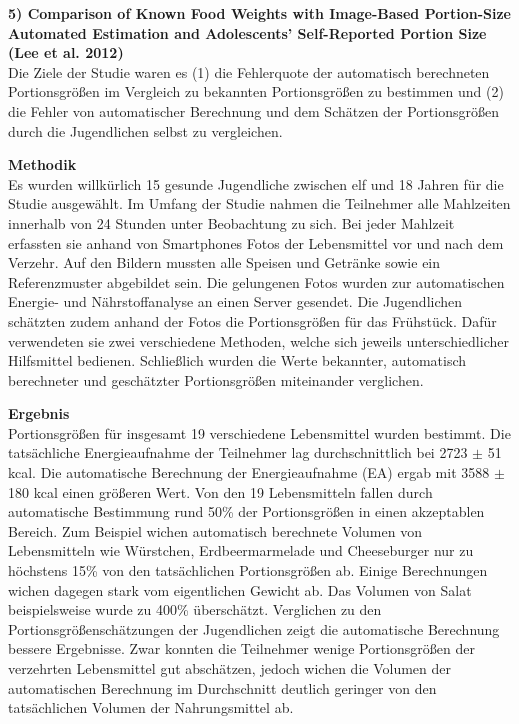 \textbf{5) Comparison of Known Food Weights with Image-Based Portion-Size Automated Estimation and Adolescents’ Self-Reported Portion Size (Lee et al. 2012)}\\
Die Ziele der Studie waren es (1) die Fehlerquote der automatisch berechneten Portionsgrößen im Vergleich zu bekannten Portionsgrößen zu bestimmen und (2) die Fehler von automatischer Berechnung und dem Schätzen der Portionsgrößen durch die Jugendlichen selbst zu vergleichen.

\textbf{Methodik}\\
Es wurden willkürlich 15 gesunde Jugendliche zwischen elf und 18 Jahren für die Studie ausgewählt. Im Umfang der Studie nahmen die Teilnehmer alle Mahlzeiten innerhalb von 24 Stunden unter Beobachtung zu sich. Bei jeder Mahlzeit erfassten sie anhand von Smartphones Fotos der Lebensmittel vor und nach dem Verzehr. Auf den Bildern mussten alle Speisen und Getränke sowie ein Referenzmuster abgebildet sein. Die gelungenen Fotos wurden zur automatischen Energie- und Nährstoffanalyse an einen Server gesendet. Die Jugendlichen schätzten zudem anhand der Fotos die Portionsgrößen für das Frühstück. Dafür verwendeten sie zwei verschiedene Methoden, welche sich jeweils unterschiedlicher Hilfsmittel bedienen. 
Schließlich wurden die Werte bekannter, automatisch berechneter und geschätzter Portionsgrößen miteinander verglichen.

\textbf{Ergebnis}\\
Portionsgrößen für insgesamt 19 verschiedene Lebensmittel wurden bestimmt. Die tatsächliche Energieaufnahme der Teilnehmer lag durchschnittlich bei 2723 $\pm$ 51 kcal. Die automatische Berechnung der Energieaufnahme (EA) ergab mit 3588 $\pm$ 180 kcal einen größeren Wert. Von den 19 Lebensmitteln fallen durch automatische Bestimmung rund 50\% der Portionsgrößen in einen akzeptablen Bereich. Zum Beispiel wichen automatisch berechnete Volumen von Lebensmitteln wie Würstchen, Erdbeermarmelade und Cheeseburger nur zu höchstens 15\% von den tatsächlichen Portionsgrößen ab. Einige Berechnungen wichen dagegen stark vom eigentlichen Gewicht ab. Das Volumen von Salat beispielsweise wurde zu 400\% überschätzt. Verglichen zu den Portionsgrößenschätzungen der Jugendlichen zeigt die automatische Berechnung bessere Ergebnisse. Zwar konnten die Teilnehmer wenige Portionsgrößen der verzehrten Lebensmittel gut abschätzen, jedoch wichen die Volumen der automatischen Berechnung im Durchschnitt deutlich geringer von den tatsächlichen Volumen der Nahrungsmittel ab. \\


